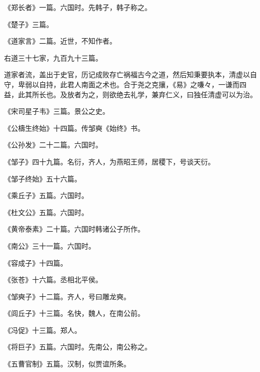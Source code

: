 \documentclass[12pt,UTF8]{ctexbook}
\begin{document}
《郑长者》一篇。六国时。先韩子，韩子称之。



《楚子》三篇。



《道家言》二篇。近世，不知作者。



右道三十七家，九百九十三篇。



道家者流，盖出于史官，历记成败存亡祸福古今之道，然后知秉要执本，清虚以自守，卑弱以自持，此君人南面之术也。合于尧之克攘，《易》之嗛々，一谦而四益，此其所长也。及放者为之，则欲绝去礼学，兼弃仁义，曰独任清虚可以为治。



《宋司星子韦》三篇。景公之史。



《公檮生终始》十四篇。传邹奭《始终》书。



《公孙发》二十二篇。六国时。



《邹子》四十九篇。名衍，齐人，为燕昭王师，居稷下，号谈天衍。



《邹子终始》五十六篇。



《乘丘子》五篇。六国时。



《杜文公》五篇。六国时。



《黄帝泰素》二十篇。六国时韩诸公子所作。



《南公》三十一篇。六国时。



《容成子》十四篇。



《张苍》十六篇。丞相北平侯。



《邹奭子》十二篇。齐人，号曰雕龙奭。



《闾丘子》十三篇。名快，魏人，在南公前。



《冯促》十三篇。郑人。



《将巨子》五篇。六国时。先南公，南公称之。



《五曹官制》五篇。汉制，似贾谊所条。
\end{document}
